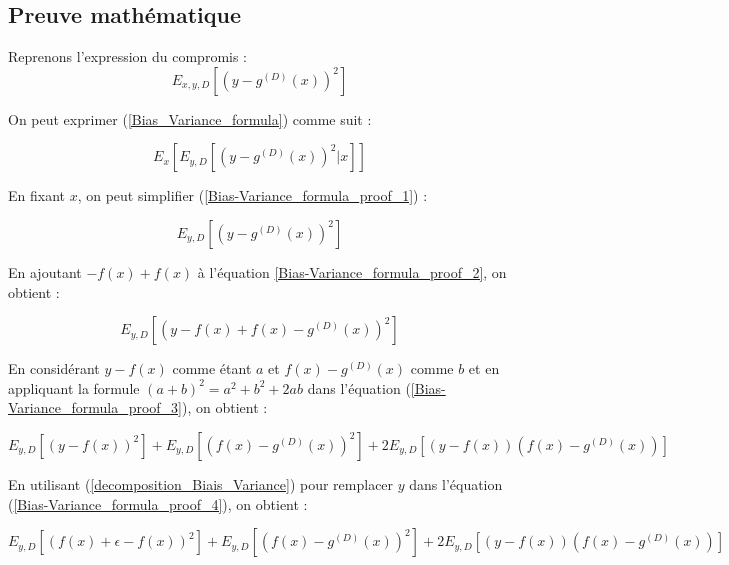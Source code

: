 \documentclass[a4paper]{article}
\begin{document}
\begin{appendices}
	
	\section{Preuve mathématique}
	\label{MathematicalProof}
	
	Reprenons l'expression du compromis :
	\begin{equation}
		\label{Bias_Variance_formula}
		E_{x,y,D}[(y-g^{(D)}(x))^2]
	\end{equation}
	
	On peut exprimer (\ref{Bias_Variance_formula}) comme suit : 
	
	\begin{equation}
		\label{Bias-Variance_formula_proof_1}
		E_x [E_{y,D} [(y - g^{(D)}(x))^2 | x]]
	\end{equation}
	
	En fixant $x$, on peut simplifier (\ref{Bias-Variance_formula_proof_1}) :
	
	\begin{equation}
		\label{Bias-Variance_formula_proof_2}
		E_{y,D}[ (y - g^{(D)}(x))^2]
	\end{equation}
	
	En ajoutant $ - f(x) + f(x) $ à l'équation \ref{Bias-Variance_formula_proof_2}, on obtient :
	
	\begin{equation}
		\label{Bias-Variance_formula_proof_3}
		E_{y,D}[ (y - f(x) + f(x) - g^{(D)}(x))^2]
	\end{equation}
	
	En considérant $ y - f(x) $ comme étant $a$ et $ f(x) - g^{(D)}(x)$ comme $b$ et en appliquant la formule $(a+b)^2 = a^2 + b^2 + 2ab$ dans l'équation (\ref{Bias-Variance_formula_proof_3}), on obtient :
	
	\begin{equation}
		\label{Bias-Variance_formula_proof_4}
		E_{y,D} [(y-f(x))^2] + E_{y,D} [(f(x) - g^{(D)}(x))^2] + 2E_{y,D} [(y-f(x)) (f(x) - g^{(D)}(x)) ]
	\end{equation}
	
	En utilisant (\ref{decomposition_Biais_Variance}) pour remplacer $y$ dans l'équation (\ref{Bias-Variance_formula_proof_4}), on obtient :
	
	\begin{equation}
		\label{Bias-Variance_formula_proof_5}
		E_{y,D} [(f(x) + \epsilon - f(x))^2] + E_{y,D} [(f(x) - g^{(D)}(x))^2] + 2E_{y,D} [(y-f(x)) (f(x) - g^{(D)}(x)) ]
	\end{equation}
	

\end{appendices}
\end{document}
